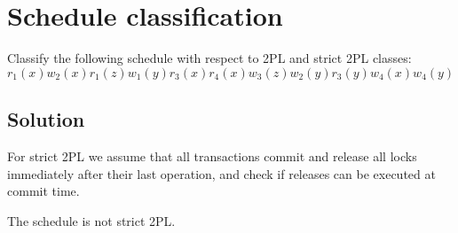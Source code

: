 \documentclass[12pt, a4paper]{report}
\begin{document}
    \newpage

    \section{Schedule classification}
        Classify the following schedule with respect to 2PL and strict 2PL classes: 
        \[r_1(x) w_2(x) r_1(z) w_1(y) r_3(x) r_4(x) w_3(z) w_2(y) r_3(y) w_4(x) w_4(y)\]
    \subsection*{Solution}
        For strict 2PL we assume that all transactions commit and release all locks immediately after their last operation, and check if releases can be executed at commit time.
        \begin{table}[H]
            \centering
        \end{table}
        The schedule is not strict 2PL.
\end{document}
